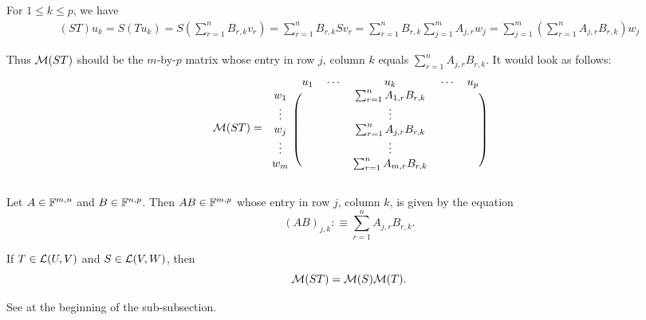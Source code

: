 For $1 \leq k \leq p$, we have
\begin{equation}
  \begin{aligned}
    (ST) u_k 
    = S (Tu_k)
    = S \left ( \sum_{r=1}^{n} B_{r,k} v_r \right )
    =  \sum_{r=1}^{n} B_{r,k} S v_r 
    =  \sum_{r=1}^{n} B_{r,k} \sum_{j=1}^{m} A_{j,r}  w_j 
    =  \sum_{j=1}^{m} \left( \sum_{r=1}^{n} A_{j,r}  B_{r,k} \right) w_j 
  \end{aligned}
\end{equation}

\begin{minipage}{\linewidth}
  Thus $\mathcal{M}(ST)$ should be the $m$-by-$p$ matrix whose entry in row $j$, column $k$ equals 
  $\sum_{r=1}^{n} A_{j,r}  B_{r,k}.$ It would look as follows:
\begin{equation}
  \mathcal{M} (ST) =
  \begin{blockarray}{cccccc}
             & u_1 & \cdots &  u_k      & \cdots & u_p \\
    \begin{block}{c(ccccc)}
      w_1    &     &        &  
        \sum_{r=1}^{n} A_{1,r}  B_{r,k} &        &     \\
      \vdots &     &        &  \vdots   &        &     \\
      w_j    &     &        &  
        \sum_{r=1}^{n} A_{j,r}  B_{r,k} &        &     \\
      \vdots &     &        &  \vdots   &        &     \\
      w_m    &     &        &  
        \sum_{r=1}^{n} A_{m,r}  B_{r,k} &        &     \\
    \end{block}
  \end{blockarray}
\end{equation}
\end{minipage}


\setcounter{thm}{40}
\begin{mydef} 
  \label{def: matrix multiplication}
  Let $A \in \mathbb{F}^{m,n}$ and $B \in \mathbb{F}^{n,p}$. Then $AB \in \mathbb{F}^{m,p}$ whose entry in row $j$, column $k$, is given by the equation
  \begin{equation}
    (AB)_{j,k} :\equiv \sum_{r=1}^{n} A_{j,r} B_{r,k}.
  \end{equation} %
\end{mydef}

\setcounter{thm}{42}
\begin{thm}
  If $T \in \mathcal{L}(U,V)$ and $S\in \mathcal{L}(V,W)$, then 
  \begin{equation}
    \mathcal{M}(ST) = \mathcal{M}(S) \mathcal{M}(T).
  \end{equation}
\end{thm}
\begin{prf}
  See at the beginning of the sub-subsection.
\end{prf}

